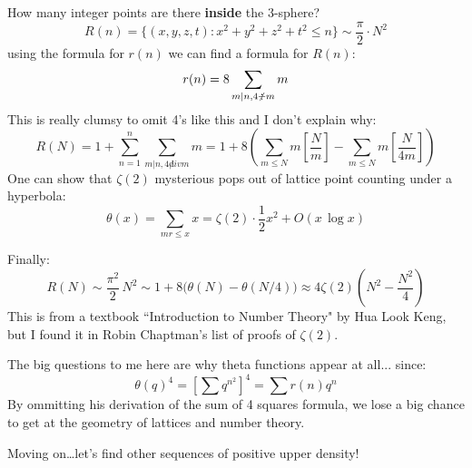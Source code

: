 \documentclass[12pt]{article}
\begin{document}
\noindent How many integer points are there {\color{black!90!white}\textbf{inside}} the 3-sphere?
$$ R(n)=\{ (x,y,z,t): x^2 + y^2 + z^2 + t^2 \leq n \} \sim \frac{\pi}{2}\cdot N^2 $$
using the formula for $r(n)$ we can find a formula for $R(n)$:
$$ r(n) = 8 \sum_{m|n, 4 \not \div m} m$$
This is really clumsy to omit 4's like this and I don't explain why:
$$ 
R(N) = 1 + \sum_{n=1}^n \sum_{m|n, 4 \not div m} m
= 1 + 8 \left( \sum_{m \leq N} m \left[\frac{N}{m}\right] 
-  \sum_{m \leq N} m \left[\frac{N}{4m}\right] \right)
$$
One can show that $\zeta(2)$ mysterious pops out of lattice point counting under a hyperbola:
$$ \theta(x) = \sum_{mr \leq x} x = 
\zeta(2) \cdot \frac{1}{2}x^2 + O(x \, \log x)$$

\newpage

\noindent Finally:
$$ R(N) \sim \frac{\pi^2}{2} \, N^2 
\sim 1 + 8 \big( \theta(N) - \theta(N/4) \big)
\approx 4 \zeta(2) \left( N^2 - \frac{N^2}{4} \right)$$
This is from a textbook ``Introduction to Number Theory" by Hua Look Keng, but I found it in Robin Chaptman's list of proofs of $\zeta(2)$. \newline

\noindent The big questions to me here are why theta functions appear at all... since:
$$ \theta(q)^4 = \left[ \sum q^{n^2} \right]^4 
= \sum r(n) q^n $$
By ommitting his derivation of the sum of 4 squares formula, we lose a big chance to get at the geometry of lattices and number theory. \newline

\noindent Moving on\dots let's find other sequences of positive upper density!
\end{document}

